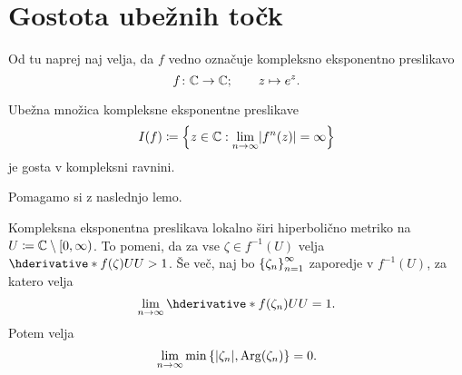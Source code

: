 \section{Gostota ubežnih točk}

Od tu naprej naj velja, da \(f\) vedno označuje kompleksno eksponentno preslikavo
\[f \colon \mathbb C \to \mathbb C; \qquad z \mapsto e^{z}.\]

\begin{izrek} \label{thm:escapingdense}
    Ubežna množica kompleksne eksponentne preslikave
    \[I (f) \coloneq \set{z \in \CC : \lim_{n \to \infty} \abs{f^n (z)} = \infty}\]
    je gosta v kompleksni ravnini.
\end{izrek}

\noindent Pomagamo si z naslednjo lemo.

\begin{lema} \label{lem:hyper}
    Kompleksna eksponentna preslikava lokalno širi hiperbolično metriko na \(U \coloneq \mathbb C \setminus [0, \infty)\). To pomeni, da za vse \(\zeta \in f^{-1} (U)\) velja \(\hder{f (\zeta)}{U}{U} > 1\). Še več, naj bo \(\left\{ \zeta_n \right\}_{n = 1}^{\infty}\) zaporedje v \(f^{-1} (U)\), za katero velja \[\lim_{n \to \infty} \hder{f (\zeta_n)}{U}{U} = 1.\] Potem velja
    \[\lim_{n \to \infty} \min \left\{ |\zeta_n|, \operatorname{Arg} (\zeta_n) \right\} = 0.\]
\end{lema}

